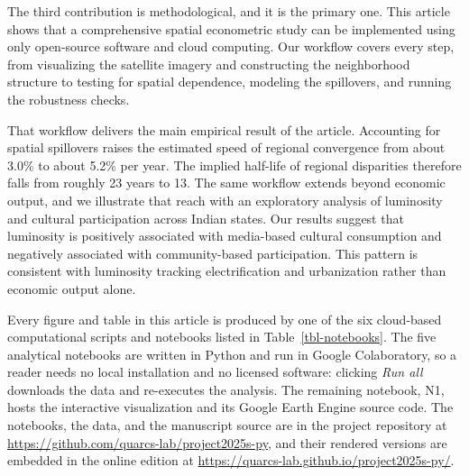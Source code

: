 \documentclass[
  letterpaper,
  DIV=11,
  numbers=noendperiod]{scrartcl}
\begin{document}
The third contribution is methodological, and it is the primary one.
This article shows that a comprehensive spatial econometric study can be
implemented using only open-source software and cloud computing. Our
workflow covers every step, from visualizing the satellite imagery and
constructing the neighborhood structure to testing for spatial
dependence, modeling the spillovers, and running the robustness checks.

That workflow delivers the main empirical result of the article.
Accounting for spatial spillovers raises the estimated speed of regional
convergence from about 3.0\% to about 5.2\% per year. The implied
half-life of regional disparities therefore falls from roughly 23 years
to 13. The same workflow extends beyond economic output, and we
illustrate that reach with an exploratory analysis of luminosity and
cultural participation across Indian states. Our results suggest that
luminosity is positively associated with media-based cultural
consumption and negatively associated with community-based
participation. This pattern is consistent with luminosity tracking
electrification and urbanization rather than economic output alone.

Every figure and table in this article is produced by one of the six
cloud-based computational scripts and notebooks listed in
Table~\ref{tbl-notebooks}. The five analytical notebooks are written in
Python and run in Google Colaboratory, so a reader needs no local
installation and no licensed software: clicking \emph{Run all} downloads
the data and re-executes the analysis. The remaining notebook, N1, hosts
the interactive visualization and its Google Earth Engine source code.
The notebooks, the data, and the manuscript source are in the project
repository at \url{https://github.com/quarcs-lab/project2025s-py}, and
their rendered versions are embedded in the online edition at
\url{https://quarcs-lab.github.io/project2025s-py/}.
\end{document}
